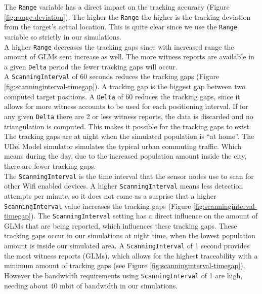 \documentclass[10pt,titlepage]{article}
\begin{document}
The \texttt{Range} variable has a direct impact on the tracking accuracy (Figure \ref{fig:range-deviation}). The higher the \texttt{Range} the higher is the tracking deviation from the target's actual location. This is quite clear since we use the \texttt{Range} variable so strictly in our simulations.\\

A higher \texttt{Range} decreases the tracking gaps since with increased range the amount of GLMs sent increase as well. The more witness reports are available in a given \texttt{Delta} period the fewer tracking gaps will occur.\\


A \texttt{ScanningInterval} of 60 seconds reduces the tracking gaps (Figure \ref{fig:scanninginterval-timegap}). A tracking gap is the biggest gap between two computed target positions. A \texttt{Delta} of 60 reduces the tracking gaps, since it allows for more witness accounts to be used for each positioning interval. If for any given \texttt{Delta} there are 2 or less witness reports, the data is discarded and no triangulation is computed. This makes it possible for the tracking gaps to exist. The tracking gaps are at night when the simulated population is ``at home''. The UDel Model simulator simulates the typical urban commuting traffic. Which means during the day, due to the increased population amount inside the city, there are fewer tracking gaps.\\



The \texttt{ScanningInterval} is the time interval that the sensor nodes use to scan for other Wifi enabled devices. A higher \texttt{ScanningInterval} means less detection attempts per minute, so it does not come as a surprise that a higher \texttt{ScanningInterval} value increases the tracking gaps (Figure \ref{fig:scanninginterval-timegap}). The \texttt{ScanningInterval} setting has a direct influence on the amount of GLMs that are being reported, which influences these tracking gaps. These tracking gaps occur in our simulations at night time, when the lowest population amount is inside our simulated area. A \texttt{ScanningInterval} of 1 second provides the most witness reports (GLMs), which allows for the highest traceability with a minimum amount of tracking gaps (see Figure \ref{fig:scanninginterval-timegap}). However the bandwidth requirements using \texttt{ScanningInterval} of 1 are high, needing about 40 mbit of bandwidth in our simulations.\\
\end{document}
